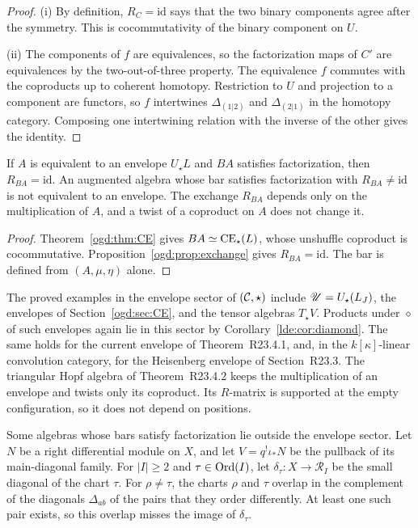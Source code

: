 \begin{proof}
(i) By definition, \(R_C=\mathrm{id}\) says that the two binary components agree after the symmetry.
This is cocommutativity of the binary component on \(U\).

(ii) The components of \(f\) are equivalences, so the factorization maps of \(C'\) are equivalences by the two-out-of-three property.
The equivalence \(f\) commutes with the coproducts up to coherent homotopy.
Restriction to \(U\) and projection to a component are functors, so \(f\) intertwines \(\Delta_{(1|2)}\) and \(\Delta_{(2|1)}\) in the homotopy category.
Composing one intertwining relation with the inverse of the other gives the identity.
\end{proof}

\begin{corollary}\label{ogd:cor:envelope-exchange}
If \(A\) is equivalent to an envelope \(U_\star L\) and \(BA\) satisfies factorization, then \(R_{BA}=\mathrm{id}\).
An augmented algebra whose bar satisfies factorization with \(R_{BA}\ne\mathrm{id}\) is not equivalent to an envelope.
The exchange \(R_{BA}\) depends only on the multiplication of \(A\), and a twist of a coproduct on \(A\) does not change it.
\end{corollary}

\begin{proof}
Theorem~\ref{ogd:thm:CE} gives \(BA\simeq\operatorname{CE}_\star(L)\), whose unshuffle coproduct is cocommutative.
Proposition~\ref{ogd:prop:exchange} gives \(R_{BA}=\mathrm{id}\).
The bar is defined from \((A,\mu,\eta)\) alone.
\end{proof}

The proved examples in the envelope sector of \((\mathcal C,\star)\) include \(\mathscr U=U_\star(L_J)\), the envelopes of Section~\ref{ogd:sec:CE}, and the tensor algebras \(T_\star V\).
Products under \(\diamond\) of such envelopes again lie in this sector by Corollary~\ref{lde:cor:diamond}.
The same holds for the current envelope of Theorem~\textup{R23.4.1}, and, in the \(k[\kappa]\)-linear convolution category, for the Heisenberg envelope of Section~\textup{R23.3}.
The triangular Hopf algebra of Theorem~\textup{R23.4.2} keeps the multiplication of an envelope and twists only its coproduct.
Its \(R\)-matrix is supported at the empty configuration, so it does not depend on positions.

Some algebras whose bars satisfy factorization lie outside the envelope sector.
Let\label{ogd:def:pulled-back-main-diagonal-object} \(N\) be a right differential module on \(X\), and let \(V=q^!\iota_*N\) be the pullback of its main-diagonal family.
For \(|I|\geq2\) and \(\tau\in\operatorname{Ord}(I)\), let \(\delta_\tau:X\to\mathscr R_I\) be the small diagonal of the chart \(\tau\).
For \(\rho\ne\tau\), the charts \(\rho\) and \(\tau\) overlap in the complement of the diagonals \(\Delta_{ab}\) of the pairs that they order differently.
At least one such pair exists, so this overlap misses the image of \(\delta_\tau\).

